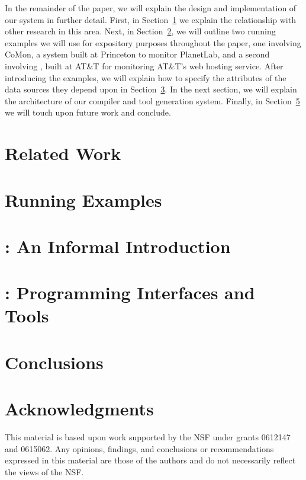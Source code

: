 \documentclass[nocopyrightspace]{sigplanconf}
\begin{document}
In the remainder of the paper, we will explain the design and
implementation of our system in further detail.  First, in Section~\ref{sec:related}
we explain the relationship with other research in this area.  Next, in Section~\ref{sec:examples},
we will outline two running examples we will use for expository purposes throughout the paper, one 
involving CoMon, a system built at Princeton to monitor PlanetLab, and a second involving
\ningaui{}, built at AT\&T for monitoring AT\&T's web hosting service.  After introducing the examples,
we will explain how to specify the attributes of the data sources they depend upon in 
Section~\ref{sec:informal}.  In the next section, we will explain the architecture of our compiler
and tool generation system.  Finally, in Section~\ref{sec:conclusions} we will touch upon future work
and conclude.

\section{Related Work}
\label{sec:related}


\section{Running Examples}
\label{sec:examples}


\section{\padsd{}: An Informal Introduction}
\label{sec:informal}


%

\section{\padsd{}:  Programming Interfaces and Tools}
\label{sec:programming}

\section{Conclusions}
\label{sec:conclusions}

\section*{Acknowledgments}

This material is based upon work 
supported by the NSF
   under grants 0612147 and 0615062.
Any opinions, findings, and conclusions or recommendations
   expressed in this material are those of the authors and do not
   necessarily reflect the views of the NSF.



\end{document}

